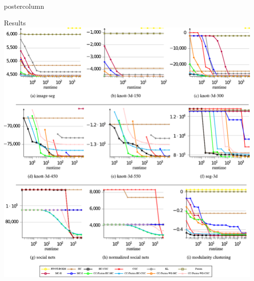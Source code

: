 \documentclass[final,hyperref={pdfpagelabels=false}]{beamer}
\begin{document}
\begin{frame}
\begin{columns}
\begin{column}{.49\textwidth}
\begin{beamercolorbox}[center,wd=\textwidth]{postercolumn}
\begin{minipage}[T]{.95\textwidth}
{\begin{block}{Results}
            \includegraphics[width=0.9\linewidth]{res_images.pdf}



\end{block}}
\end{minipage}
\end{beamercolorbox}
\end{column}
\end{columns}
\end{frame}
\end{document}
